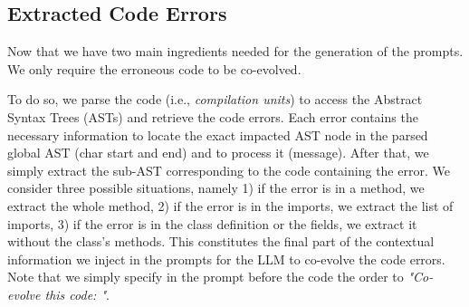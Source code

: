 

\subsection{Extracted Code Errors}

Now that we have two main ingredients needed for the generation of the prompts. %
We only require the erroneous code to be co-evolved. 

To do so, we parse the code (i.e., \emph{compilation units}) to access the Abstract Syntax Trees (ASTs) and retrieve the code errors. %
Each error contains the necessary information to locate the exact impacted AST node in the parsed global AST (\ie char start and end) and to process it (\ie message). 
After that, we simply extract the sub-AST corresponding to the code containing the error. 
We consider three possible situations, namely 1) if the error is in a method, we extract the whole method, 2) if the error is in the imports, we extract the list of imports, 3) if the error is in the class definition or the fields, we extract it without the class's methods. This constitutes the final part of the contextual information we inject in the prompts for the LLM to co-evolve the code errors. Note that we simply specify in the prompt before the code the order to \emph{"Co-evolve this code: "}.



